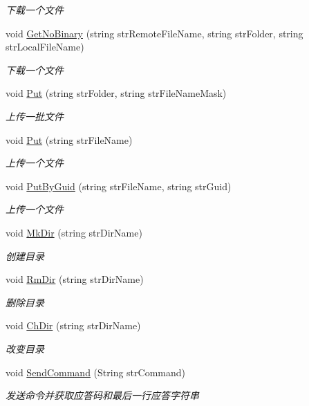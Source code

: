 \begin{DoxyCompactItemize}
\begin{DoxyCompactList}\small\item\em 下载一个文件 \end{DoxyCompactList}\item 
void \hyperlink{class_x_c_l_net_tools_1_1_f_t_p_1_1_f_t_p_client_a7648a7d3ce55e3332618aca711c3d6ea}{Get\+No\+Binary} (string str\+Remote\+File\+Name, string str\+Folder, string str\+Local\+File\+Name)
\begin{DoxyCompactList}\small\item\em 下载一个文件 \end{DoxyCompactList}\item 
void \hyperlink{class_x_c_l_net_tools_1_1_f_t_p_1_1_f_t_p_client_aa610dab6dd9699203f7d4da488b3ca20}{Put} (string str\+Folder, string str\+File\+Name\+Mask)
\begin{DoxyCompactList}\small\item\em 上传一批文件 \end{DoxyCompactList}\item 
void \hyperlink{class_x_c_l_net_tools_1_1_f_t_p_1_1_f_t_p_client_a0ce0fbef1a6c4a2c872315c104f8fd62}{Put} (string str\+File\+Name)
\begin{DoxyCompactList}\small\item\em 上传一个文件 \end{DoxyCompactList}\item 
void \hyperlink{class_x_c_l_net_tools_1_1_f_t_p_1_1_f_t_p_client_a9f333aedd5467c2fdc46d33298dc9dbb}{Put\+By\+Guid} (string str\+File\+Name, string str\+Guid)
\begin{DoxyCompactList}\small\item\em 上传一个文件 \end{DoxyCompactList}\item 
void \hyperlink{class_x_c_l_net_tools_1_1_f_t_p_1_1_f_t_p_client_aaf6ecfb2034736ffe5f88945ec873efe}{Mk\+Dir} (string str\+Dir\+Name)
\begin{DoxyCompactList}\small\item\em 创建目录 \end{DoxyCompactList}\item 
void \hyperlink{class_x_c_l_net_tools_1_1_f_t_p_1_1_f_t_p_client_a4c4167a6afd00ed6e1f5303e59555037}{Rm\+Dir} (string str\+Dir\+Name)
\begin{DoxyCompactList}\small\item\em 删除目录 \end{DoxyCompactList}\item 
void \hyperlink{class_x_c_l_net_tools_1_1_f_t_p_1_1_f_t_p_client_a6345c0af7cd414503395170157d0db3b}{Ch\+Dir} (string str\+Dir\+Name)
\begin{DoxyCompactList}\small\item\em 改变目录 \end{DoxyCompactList}\item 
void \hyperlink{class_x_c_l_net_tools_1_1_f_t_p_1_1_f_t_p_client_af99f1f4bd038882ec30bdf4e89d73d4a}{Send\+Command} (String str\+Command)
\begin{DoxyCompactList}\small\item\em 发送命令并获取应答码和最后一行应答字符串 \end{DoxyCompactList}\end{DoxyCompactItemize}
